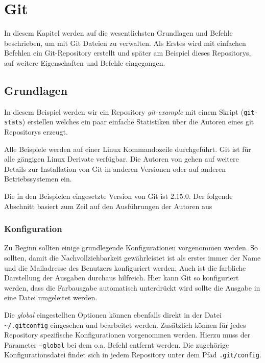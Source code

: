 \chapter{Git}\label{cha:Git}
In diesem Kapitel werden auf die wesentlichsten Grundlagen und Befehle
beschrieben, um mit Git Dateien zu verwalten. Als Erstes wird mit einfachen
Befehlen ein Git-Repository erstellt und später am Beispiel dieses Repositorys,
auf weitere Eigenschaften und Befehle eingegangen.

\section{Grundlagen}\label{gitbasics}
In diesem Beispiel werden wir ein Repository \textit{git-example} mit einem
Skript (\texttt{git-stats}) erstellen welches ein paar einfache Statistiken
über die Autoren eines git Repositorys erzeugt.

Alle Beispiele werden auf einer Linux Kommandozeile durchgeführt. Git ist für
alle gängigen Linux Derivate verfügbar. Die Autoren von \cite[S.~12-14]{progit}
gehen auf weitere Details zur Installation von Git in anderen Versionen oder
auf anderen Betriebssystemen ein.

Die in den Beispielen eingesetzte Version von Git ist 2.15.0. Der folgende
Abschnitt basiert zum Zeil auf den Ausführungen der Autoren aus
\cite[S.22-57]{gitops}



\subsection{Konfiguration}\label{gitconfig}
Zu Beginn sollten einige grundlegende Konfigurationen vorgenommen werden. So
sollten, damit die Nachvollziehbarkeit gewährleistet ist als erstes immer der
Name und die Mailadresse des Benutzers konfiguriert werden. Auch ist die
farbliche Darstellung der Ausgaben durchaus hilfreich. Hier kann Git so
konfiguriert werden, dass die Farbausgabe automatisch unterdrückt wird sollte
die Ausgabe in eine Datei umgeleitet werden.



Die \textit{global} eingestellten Optionen können ebenfalls direkt in der Datei
\texttt{\textasciitilde/.gitconfig} eingesehen und bearbeitet werden.
Zusätzlich können für jedes Repository spezifische Konfigurationen vorgenommen
werden. Hierzu muss der Parameter \texttt{--global} bei dem o.a. Befehl
entfernt werden. Die zugehörige Konfigurationsdatei findet sich in jedem
Repository unter dem Pfad \texttt{.git/config}.

